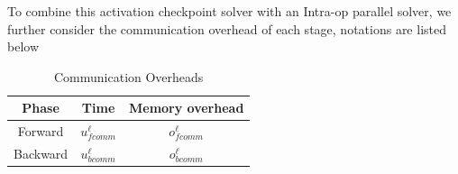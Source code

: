 \begin{table}[H]
    \caption{List of Operations}
    \label{tab:act_ops}
\end{table}

To combine this activation checkpoint solver with an Intra-op parallel solver, we further consider the communication overhead of each stage, notations are listed below

\begin{table}[H]
    \centering
    \begin{tabular}{|c|c|c|}
        \hline
        Phase & Time & Memory overhead \\
        \hline
        Forward & $u_{fcomm}^{\ell}$ & $o_{fcomm}^{\ell}$ \\
        \hline
        Backward & $u_{bcomm}^{\ell}$ & $o_{bcomm}^{\ell}$ \\
        \hline
    \end{tabular}
    \caption{Communication Overheads}
    \label{tab:comm_ops}
\end{table}

